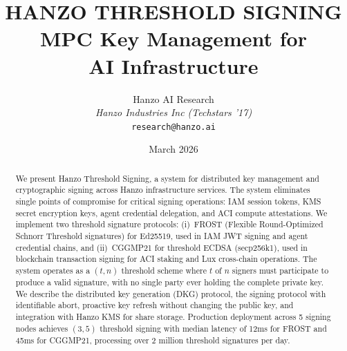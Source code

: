 \documentclass[11pt]{article}
\title{HANZO THRESHOLD SIGNING\\[0.3em]
{\large MPC Key Management for\\AI Infrastructure}}
\author{
    Hanzo AI Research \\
    \textit{Hanzo Industries Inc (Techstars '17)} \\
    \texttt{research@hanzo.ai}
}
\date{March 2026}
\begin{document}
\hanzocoverpage

\begin{abstract}
We present Hanzo Threshold Signing, a system for distributed key management and
cryptographic signing across Hanzo infrastructure services. The system eliminates
single points of compromise for critical signing operations: IAM session tokens,
KMS secret encryption keys, agent credential delegation, and ACI compute
attestations. We implement two threshold signature protocols: (i)~FROST
(Flexible Round-Optimized Schnorr Threshold signatures) for Ed25519, used in
IAM JWT signing and agent credential chains, and (ii)~CGGMP21 for threshold
ECDSA (secp256k1), used in blockchain transaction signing for ACI staking and
Lux cross-chain operations. The system operates as a $(t, n)$ threshold scheme
where $t$ of $n$ signers must participate to produce a valid signature, with no
single party ever holding the complete private key. We describe the distributed
key generation (DKG) protocol, the signing protocol with identifiable abort,
proactive key refresh without changing the public key, and integration with
Hanzo KMS for share storage. Production deployment across 5 signing nodes
achieves $(3, 5)$ threshold signing with median latency of 12ms for FROST and
45ms for CGGMP21, processing over 2 million threshold signatures per day.
\end{abstract}











\end{document}
